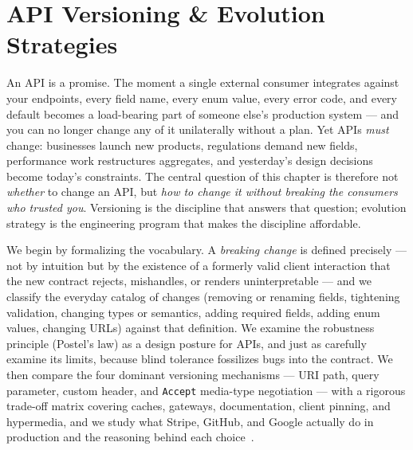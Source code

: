 \chapter{API Versioning \& Evolution Strategies}
\label{ch:versioning}

An API is a promise. The moment a single external consumer integrates against
your endpoints, every field name, every enum value, every error code, and every
default becomes a load-bearing part of someone else's production system --- and
you can no longer change any of it unilaterally without a plan. Yet APIs
\emph{must} change: businesses launch new products, regulations demand new
fields, performance work restructures aggregates, and yesterday's design
decisions become today's constraints. The central question of this chapter is
therefore not \emph{whether} to change an API, but \emph{how to change it
without breaking the consumers who trusted you}. Versioning is the discipline
that answers that question; evolution strategy is the engineering program that
makes the discipline affordable.

We begin by formalizing the vocabulary. A \emph{breaking change} is defined
precisely --- not by intuition but by the existence of a formerly valid client
interaction that the new contract rejects, mishandles, or renders
uninterpretable --- and we classify the everyday catalog of changes (removing
or renaming fields, tightening validation, changing types or semantics, adding
required fields, adding enum values, changing URLs) against that definition.
We examine the robustness principle (Postel's law) as a design posture for
APIs, and just as carefully examine its limits, because blind tolerance
fossilizes bugs into the contract. We then compare the four dominant
versioning mechanisms --- URI path, query parameter, custom header, and
\texttt{Accept} media-type negotiation --- with a rigorous trade-off matrix
covering caches, gateways, documentation, client pinning, and hypermedia, and
we study what Stripe, GitHub, and Google actually do in production and the
reasoning behind each choice~\cite{gehl2021apidesign}.


